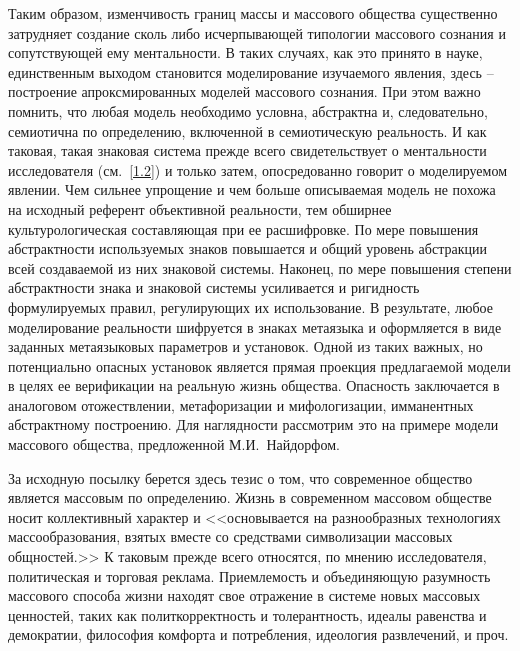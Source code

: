 Таким образом, изменчивость границ массы и массового общества существенно затрудняет создание сколь
либо исчерпывающей типологии массового сознания и сопутствующей ему ментальности. В таких случаях,
как это принято в науке, единственным выходом становится моделирование изучаемого явления, здесь --
построение апроксмированных моделей массового сознания. При этом важно помнить, что любая модель
необходимо условна, абстрактна и, следовательно, семиотична по определению, включенной в семиотическую реальность.
И как таковая, такая знаковая система прежде всего свидетельствует о ментальности исследователя (см.~\ref{1.2}) и
только затем, опосредованно говорит о моделируемом явлении.
Чем сильнее упрощение и чем больше описываемая модель не похожа на исходный референт объективной реальности,
тем обширнее культурологическая составляющая при ее расшифровке. По мере повышения абстрактности используемых
знаков повышается и общий уровень абстракции всей создаваемой из них знаковой системы. Наконец, по мере
повышения степени абстрактности знака и знаковой системы усиливается и ригидность формулируемых правил,
регулирующих их использование. В результате, любое моделирование реальности шифруется в знаках метаязыка и
оформляется в виде заданных метаязыковых параметров и установок. Одной из таких важных, но потенциально опасных
установок является прямая проекция предлагаемой модели в целях ее верификации на реальную жизнь общества.
Опасность заключается в аналоговом отожествлении, метафоризации и мифологизации, имманентных абстрактному
построению. Для наглядности рассмотрим это на примере модели массового общества, предложенной М.И.~Найдорфом\autocite{ocherki}.

За исходную посылку берется здесь тезис о том, что современное общество является массовым по определению.
Жизнь в современном массовом обществе носит коллективный характер и <<основывается на разнообразных технологиях
массообразования, взятых вместе со средствами символизации массовых общностей.>>\autocite{ocherki}
К таковым прежде всего относятся, по мнению исследователя, политическая и торговая реклама. Приемлемость
и объединяющую разумность массового способа жизни находят свое отражение в системе новых массовых
ценностей, таких как политкорректность и толерантность, идеалы равенства и демократии, философия комфорта
и потребления, идеология развлечений, и проч.

